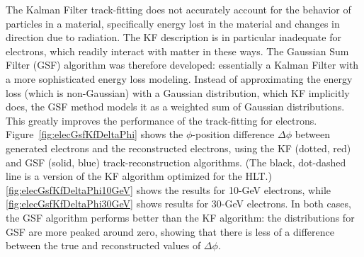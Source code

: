 The Kalman Filter track-fitting does not accurately 
account for the behavior of particles in a material, 
specifically energy lost in the material 
and changes in direction due to radiation.  
The KF description is in particular inadequate 
for electrons, which 
readily interact with matter in these ways.  
The Gaussian Sum Filter (GSF) algorithm 
\cite{CMS-NOTE-2005-001} was 
therefore developed:
essentially a Kalman Filter 
with a more sophisticated energy loss modeling.   
Instead of approximating the energy loss 
(which is non-Gaussian)
with a Gaussian distribution, 
which KF implicitly does, 
the GSF method models it as a 
weighted sum of Gaussian distributions.  
This greatly improves the performance 
of the track-fitting for electrons.  
Figure~\ref{fig:elecGsfKfDeltaPhi} shows the 
$\phi$-position difference $\Delta\phi$
between generated electrons 
and the reconstructed electrons, using 
the KF (dotted, red) and GSF (solid, blue) 
track-reconstruction algorithms.  
(The black, dot-dashed line is a version of the 
KF algorithm optimized for the HLT.)  
\ref{fig:elecGsfKfDeltaPhi10GeV} shows the results 
for 10-GeV electrons, while 
\ref{fig:elecGsfKfDeltaPhi30GeV} shows results for 
30-GeV electrons.  
In both cases, the GSF algorithm performs better 
than the KF algorithm: 
the distributions for GSF are more peaked around zero, 
showing that there is less of a difference 
between the true and reconstructed values of $\Delta\phi$. 

